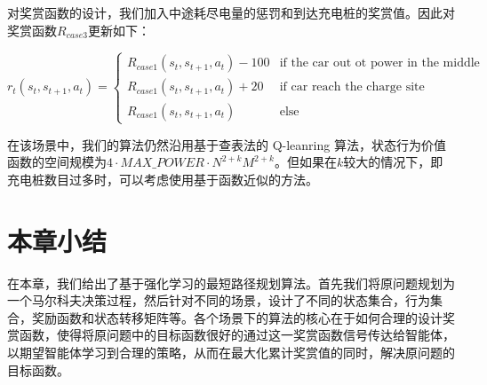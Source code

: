 \documentclass{standalone}
\begin{document}
对奖赏函数的设计，我们加入中途耗尽电量的惩罚和到达充电桩的奖赏值。因此对奖赏函数$R_{case3}$更新如下：
\begin{center}
    \begin{equation}
    r_t(s_t, s_{t+1}, a_t) = \begin{cases}
     R_{case1}(s_t, s_{t+1}, a_t) - 100 &\mbox{if the car out ot power in the middle}\\
     R_{case1}(s_t, s_{t+1}, a_t) + 20&\mbox{if car reach the charge site}\\
     R_{case1}(s_t, s_{t+1}, a_t)&\mbox{else}
     \end{cases}
    \end{equation}
\end{center}
在该场景中，我们的算法仍然沿用基于查表法的 Q-leanring 算法，状态行为价值函数的空间规模为$4\cdot MAX\_POWER\cdot N^{2+k}M^{2+k}$。但如果在$k$较大的情况下，即充电桩数目过多时，可以考虑使用基于函数近似的方法。
\section{本章小结}
在本章，我们给出了基于强化学习的最短路径规划算法。首先我们将原问题规划为一个马尔科夫决策过程，然后针对不同的场景，设计了不同的状态集合，行为集合，奖励函数和状态转移矩阵等。各个场景下的算法的核心在于如何合理的设计奖赏函数，使得将原问题中的目标函数很好的通过这一奖赏函数信号传达给智能体，以期望智能体学习到合理的策略，从而在最大化累计奖赏值的同时，解决原问题的目标函数。
\end{document}

